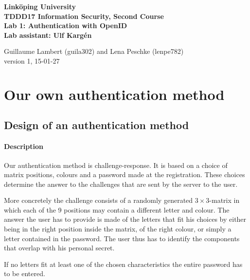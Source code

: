 \documentclass[11pt,a4paper]{article}
\begin{document}
	
\begin{center}
{\bfseries
Linköping University\\
TDDD17 Information Security, Second Course\\

Lab 1: Authentication with OpenID\\
Lab assistant: Ulf Kargén\\[10pt]}

Guillaume Lambert (guila302) and Lena Peschke (lenpe782)\\
version 1, 15-01-27
\end{center}

\hrulefill


\section*{Our own authentication method}
\subsection*{Design of an authentication method}
\paragraph{Description}

Our authentication method is challenge-response. It is based on a choice of matrix positions, colours and a password made at the registration.
These choices determine the answer to the challenges that are sent by the server to the user.

More concretely the challenge consists of a randomly generated $3\times3$-matrix in which each of the 9 positions may contain a different letter and colour.
The answer the user has to provide is made of the letters that fit his choices by either being in the right position inside the matrix, of the right colour, or simply a letter contained in the password. The user thus has to identify the components that overlap with his personal secret.

If no letters fit at least one of the chosen characteristics the entire password has to be entered.
\end{document}
